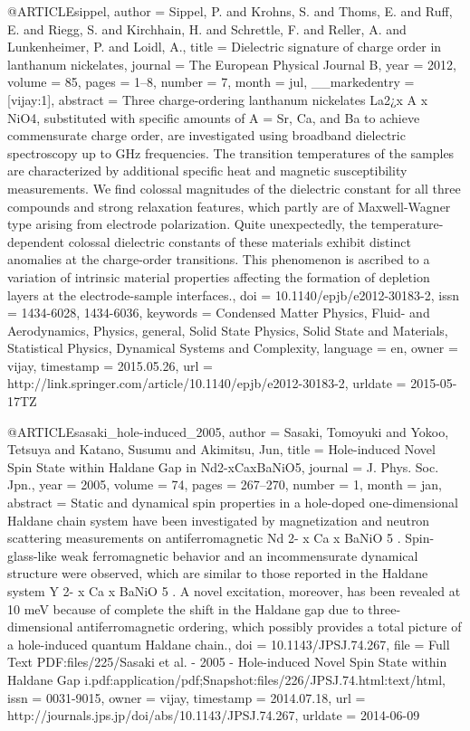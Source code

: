 @ARTICLE{sippel,
  author = {Sippel, P. and Krohns, S. and Thoms, E. and Ruff, E. and Riegg, S.
	and Kirchhain, H. and Schrettle, F. and Reller, A. and Lunkenheimer,
	P. and Loidl, A.},
  title = {Dielectric signature of charge order in lanthanum nickelates},
  journal = {The European Physical Journal B},
  year = {2012},
  volume = {85},
  pages = {1--8},
  number = {7},
  month = jul,
  __markedentry = {[vijay:1]},
  abstract = {Three charge-ordering lanthanum nickelates La2¿x A x NiO4, substituted
	with specific amounts of A = Sr, Ca, and Ba to achieve commensurate
	charge order, are investigated using broadband dielectric spectroscopy
	up to GHz frequencies. The transition temperatures of the samples
	are characterized by additional specific heat and magnetic susceptibility
	measurements. We find colossal magnitudes of the dielectric constant
	for all three compounds and strong relaxation features, which partly
	are of Maxwell-Wagner type arising from electrode polarization. Quite
	unexpectedly, the temperature-dependent colossal dielectric constants
	of these materials exhibit distinct anomalies at the charge-order
	transitions. This phenomenon is ascribed to a variation of intrinsic
	material properties affecting the formation of depletion layers at
	the electrode-sample interfaces.},
  doi = {10.1140/epjb/e2012-30183-2},
  issn = {1434-6028, 1434-6036},
  keywords = {Condensed Matter Physics, Fluid- and Aerodynamics, Physics, general,
	Solid State Physics, Solid State and Materials, Statistical Physics,
	Dynamical Systems and Complexity},
  language = {en},
  owner = {vijay},
  timestamp = {2015.05.26},
  url = {http://link.springer.com/article/10.1140/epjb/e2012-30183-2},
  urldate = {2015-05-17TZ}
}

@ARTICLE{sasaki_hole-induced_2005,
  author = {Sasaki, Tomoyuki and Yokoo, Tetsuya and Katano, Susumu and Akimitsu,
	Jun},
  title = {Hole-induced Novel Spin State within Haldane Gap in Nd2-{xCaxBaNiO}5},
  journal = {J. Phys. Soc. Jpn.},
  year = {2005},
  volume = {74},
  pages = {267--270},
  number = {1},
  month = jan,
  abstract = {Static and dynamical spin properties in a hole-doped one-dimensional
	Haldane chain system have been investigated by magnetization and
	neutron scattering measurements on antiferromagnetic Nd 2- x Ca x
	{BaNiO} 5 . Spin-glass-like weak ferromagnetic behavior and an incommensurate
	dynamical structure were observed, which are similar to those reported
	in the Haldane system Y 2- x Ca x {BaNiO} 5 . A novel excitation,
	moreover, has been revealed at 10 {meV} because of complete the shift
	in the Haldane gap due to three-dimensional antiferromagnetic ordering,
	which possibly provides a total picture of a hole-induced quantum
	Haldane chain.},
  doi = {10.1143/JPSJ.74.267},
  file = {Full Text PDF:files/225/Sasaki et al. - 2005 - Hole-induced Novel Spin State within Haldane Gap i.pdf:application/pdf;Snapshot:files/226/JPSJ.74.html:text/html},
  issn = {0031-9015},
  owner = {vijay},
  timestamp = {2014.07.18},
  url = {http://journals.jps.jp/doi/abs/10.1143/JPSJ.74.267},
  urldate = {2014-06-09}
}


